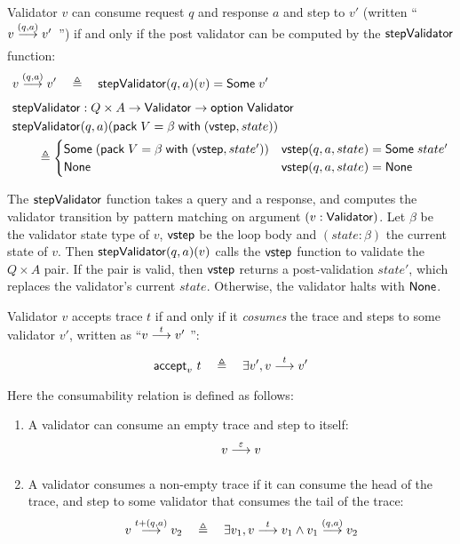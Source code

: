 \begin{definition}
  \label{def:validator-step}
  Validator $v$ can consume request $q$ and response $a$ and step to $v'$
  (written ``$\behaves v{(q,a)}v'$~'') if and only if the post validator can be
  computed by the $\mathsf{stepValidator}$ function:
\begin{align*}
  &\behaves v{(q,a)}v'\quad\triangleq\quad\stepValidator(q,a)(v)=\Some v'\\
  &\stepValidator:Q\times A\to\Validator\to\option\Validator\\
  &\stepValidator(q,a)(\existT{V}{\beta}{(\vstep,state)})\\
  &\qquad\triangleq\begin{cases}
  \Some{(\existT{V}{\beta}{(\vstep,state')})} & \vstep(q,a,state)=\Some{state'} \\
  \None & \vstep(q,a,state)=\None
  \end{cases}
\end{align*}

The $\mathsf{stepValidator}$ function takes a query and a response, and computes the
validator transition by pattern matching on argument $(v:\mathsf{Validator})$.  Let
$\beta$ be the validator state type of $v$, $\mathsf{vstep}$ be the loop body and
$(state:\beta)$ the current state of $v$.  Then $\mathsf{stepValidator}(q,a)(v)$ calls
the $\mathsf{vstep}$ function to validate the $Q\times A$ pair.  If the pair is valid,
then $\mathsf{vstep}$ returns a post-validation $state'$, which replaces the validator's
current $state$.  Otherwise, the validator halts with $\mathsf{None}$.
\end{definition}

\begin{definition}
Validator $v$ accepts trace $t$ if and only if it {\em cosumes} the trace and
steps to some validator $v'$, written as ``$\behaves vtv'~$'':
\[\accepts v t\quad\triangleq\quad\exists v',\behaves v t v'\]
Here the consumability relation is defined as follows:
\begin{enumerate}
\item A validator can consume an empty trace and step to itself:
  \[\behaves v\nil v\]
\item A validator consumes a non-empty trace if it can consume the head of the
  trace, and step to some validator that consumes the tail of the trace:
  \[\behaves v {t+(q,a)} v_2\quad\triangleq\quad\exists v_1,\behaves v t v_1\wedge
  \behaves{v_1}{(q,a)}{v_2}\]
\end{enumerate}
\end{definition}
